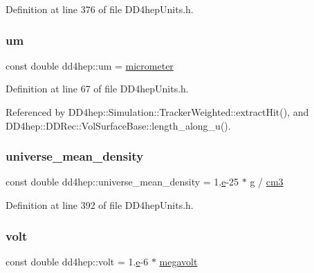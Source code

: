 Definition at line 376 of file D\+D4hep\+Units.\+h.

\hypertarget{namespacedd4hep_a7ca6a7ec6a20ddb5678bd46c47996d26}{}\label{namespacedd4hep_a7ca6a7ec6a20ddb5678bd46c47996d26} 
\subsubsection{\texorpdfstring{um}{um}}
{\footnotesize\ttfamily const double dd4hep\+::um = \hyperlink{namespacedd4hep_ae1c0791e549db4ff640f02a54c2e4e11}{micrometer}\hspace{0.3cm}{\ttfamily [static]}}



Definition at line 67 of file D\+D4hep\+Units.\+h.



Referenced by D\+D4hep\+::\+Simulation\+::\+Tracker\+Weighted\+::extract\+Hit(), and D\+D4hep\+::\+D\+D\+Rec\+::\+Vol\+Surface\+Base\+::length\+\_\+along\+\_\+u().

\hypertarget{namespacedd4hep_a139a30c8403dfa4a6294daf563d735dd}{}\label{namespacedd4hep_a139a30c8403dfa4a6294daf563d735dd} 
\subsubsection{\texorpdfstring{universe\+\_\+mean\+\_\+density}{universe\_mean\_density}}
{\footnotesize\ttfamily const double dd4hep\+::universe\+\_\+mean\+\_\+density = 1.\hyperlink{_volumes_8cpp_a8a9a1f93e9b09afccaec215310e64142}{e}-\/25 $\ast$ \hyperlink{namespacedd4hep_a70d02ec06109b52625ae28861ff25d56}{g} / \hyperlink{namespacedd4hep_a6464c11bda4aa7d6c4d42f70dbcaf803}{cm3}\hspace{0.3cm}{\ttfamily [static]}}



Definition at line 392 of file D\+D4hep\+Units.\+h.

\hypertarget{namespacedd4hep_a1bbac6ed4a69b41427c9a44a513e2500}{}\label{namespacedd4hep_a1bbac6ed4a69b41427c9a44a513e2500} 
\subsubsection{\texorpdfstring{volt}{volt}}
{\footnotesize\ttfamily const double dd4hep\+::volt = 1.\hyperlink{_volumes_8cpp_a8a9a1f93e9b09afccaec215310e64142}{e}-\/6 $\ast$ \hyperlink{namespacedd4hep_a0899b6d1861ddc5f615d06209fb6a9fe}{megavolt}\hspace{0.3cm}{\ttfamily [static]}}



